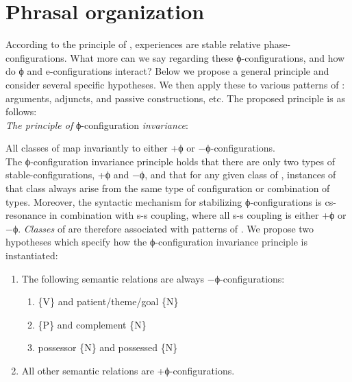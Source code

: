 \section{Phrasal organization}

According to the principle of ,  experiences are stable relative phase-configurations. What more can we say regarding these ϕ-configurations, and how do ϕ and e-configurations interact? Below we propose a general principle and consider several specific hypotheses. We then apply these to various patterns of : arguments, adjuncts,  and passive constructions, etc. The proposed principle is as follows:\\

\noindent\textit{The principle of} ϕ-configuration \textit{invariance}: 

\noindent All classes of  map invariantly to either +ϕ or −ϕ-con\-fig\-u\-ra\-tions. \\

  The ϕ-configuration invariance principle holds that there are only two types of stable-configurations, +ϕ and −ϕ, and that for any given class of , instances of that class always arise from the same type of configuration or combination of types. Moreover, the syntactic mechanism for stabilizing ϕ-configurations is cs-resonance in combination with s-s coupling, where all s-s coupling is either +ϕ or −ϕ. \textit{Classes} of  are therefore associated with patterns of . We propose two hypotheses which specify how the ϕ-configuration invariance principle is instantiated:
  
\begin{enumerate}
\item The following semantic relations are always −ϕ-configurations:
\begin{enumerate}
  \item \{V\} and patient/theme/goal \{N\}
  \item {} \{P\} and complement \{N\}
  \item possessor \{N\} and possessed \{N\}
\end{enumerate}
\item  All other semantic relations are +ϕ-configurations.
\end{enumerate}

